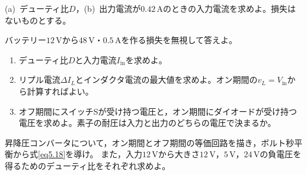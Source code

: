 \begin{章末問題}
\item \label{ex5.1}(a)~デューティ比$D$，(b)~出力電流が$0.42$\,Aのときの入力電流を求めよ。損失はないものとする。

\item \label{ex5.toi3}

\item \label{ex5.2}バッテリー$12$\,Vから$48$\,V・$0.5$\,Aを作る損失を無視して答えよ。
\begin{enumerate}
\item[(a)] デューティ比$D$と入力電流$I_{\mathrm{in}}$を求めよ。
\item[(b)] リプル電流$\mathit{\Delta}I_L$とインダクタ電流の最大値を求めよ。オン期間の$v_L = V_{\mathrm{in}}$から計算すればよい。
\item[(c)] オフ期間にスイッチSが受け持つ電圧と，オン期間にダイオードが受け持つ電圧を求めよ。素子の耐圧は入力と出力のどちらの電圧で決まるか。
\end{enumerate}

\item \label{ex5.3}昇降圧コンバータについて，オン期間とオフ期間の等価回路を描き，ボルト秒平衡から式\ref{eq5.18}を導け。
また，入力$12$\,Vから大きさ$12$\,V，$5$\,V，$24$\,Vの負電圧を得るためのデューティ比をそれぞれ求めよ。


\item \label{ex5.rei2}


\end{章末問題}
